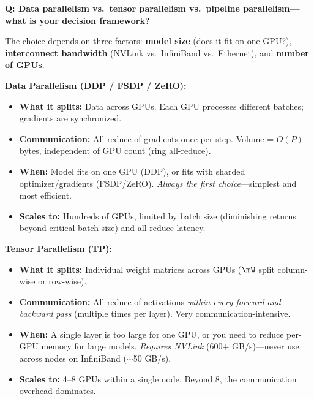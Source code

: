 \begin{interviewq}
\textbf{Q: Data parallelism vs.\ tensor parallelism vs.\ pipeline parallelism---what is your decision framework?}

 \quad {} \quad \badgefreq{\freqhigh}

\stronganswer

The choice depends on three factors: \textbf{model size} (does it fit on one GPU?), \textbf{interconnect bandwidth} (NVLink vs.\ InfiniBand vs.\ Ethernet), and \textbf{number of GPUs}.

\textbf{Data Parallelism (DDP / FSDP / ZeRO):}
\begin{itemize}
    \item \textbf{What it splits:} Data across GPUs. Each GPU processes different batches; gradients are synchronized.
    \item \textbf{Communication:} All-reduce of gradients once per step. Volume = $O(P)$ bytes, independent of GPU count (ring all-reduce).
    \item \textbf{When:} Model fits on one GPU (DDP), or fits with sharded optimizer/gradients (FSDP/ZeRO). \textit{Always the first choice}---simplest and most efficient.
    \item \textbf{Scales to:} Hundreds of GPUs, limited by batch size (diminishing returns beyond critical batch size) and all-reduce latency.
\end{itemize}

\textbf{Tensor Parallelism (TP):}
\begin{itemize}
    \item \textbf{What it splits:} Individual weight matrices across GPUs ($\mW$ split column-wise or row-wise).
    \item \textbf{Communication:} All-reduce of activations \textit{within every forward and backward pass} (multiple times per layer). Very communication-intensive.
    \item \textbf{When:} A single layer is too large for one GPU, or you need to reduce per-GPU memory for large models. \textit{Requires NVLink} (600+ GB/s)---never use across nodes on InfiniBand ($\sim$50 GB/s).
    \item \textbf{Scales to:} 4--8 GPUs within a single node. Beyond 8, the communication overhead dominates.
\end{itemize}


\end{interviewq}
